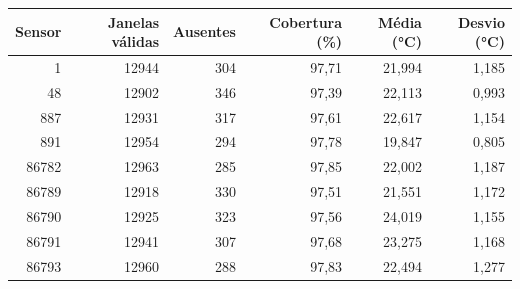 \begin{tabular}{rrrrrr}
\toprule
Sensor & Janelas válidas & Ausentes & Cobertura (\%) & Média (°C) & Desvio (°C) \\
\midrule
1 & 12944 & 304 & 97,71 & 21,994 & 1,185 \\
48 & 12902 & 346 & 97,39 & 22,113 & 0,993 \\
887 & 12931 & 317 & 97,61 & 22,617 & 1,154 \\
891 & 12954 & 294 & 97,78 & 19,847 & 0,805 \\
86782 & 12963 & 285 & 97,85 & 22,002 & 1,187 \\
86789 & 12918 & 330 & 97,51 & 21,551 & 1,172 \\
86790 & 12925 & 323 & 97,56 & 24,019 & 1,155 \\
86791 & 12941 & 307 & 97,68 & 23,275 & 1,168 \\
86793 & 12960 & 288 & 97,83 & 22,494 & 1,277 \\
\bottomrule
\end{tabular}
